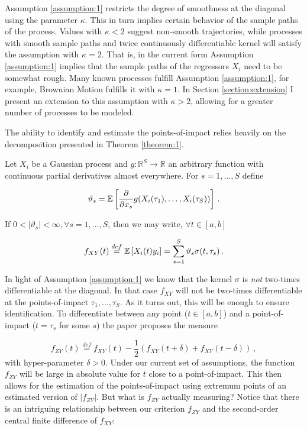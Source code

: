Assumption \ref{assumption:1} restricts the degree of smoothness at the diagonal using
the parameter $\kappa$. This in turn implies certain behavior of the sample paths of the
process. Values with $\kappa < 2$ suggest non-smooth trajectories, while processes with
smooth sample paths and twice continuously differentiable kernel will satisfy the
assumption with $\kappa = 2$. That is, in the current form Assumption \ref{assumption:1}
implies that the sample paths of the regressors $X_i$ need to be somewhat rough. Many
known processes fulfill Assumption \ref{assumption:1}, for example, Brownian Motion
fulfills it with $\kappa = 1$. In Section \ref{section:extension} I present an extension
to this assumption with $\kappa > 2$, allowing for a greater number of processes to be
modeled.


The ability to identify and estimate the points-of-impact relies heavily on the
decomposition presented in Theorem \ref{theorem:1}.


\begin{theorem}
Let $X_i$ be a Gaussian process and $g : \mathbb{R}^S \to \mathbb{R}$ an arbitrary
function with continuous partial derivatives almost everywhere. For $s=1,\dots,S$ define

\[
    \vartheta_s = \mathbb{E}\left[\frac{\partial}{\partial x_s} g(X_i(\tau_1), \dots,
    X_i(\tau_S))\right] \,.
\]

If $0 < \left| \vartheta_s \right| < \infty, \forall s=1,\dots,S$, then we may write,
$\forall t \in [a, b]$

\[
    f_{XY}(t) \stackrel{def}{=} \mathbb{E}\left[X_i(t) y_i\right] = \sum_{s=1}^S \vartheta_s
    \sigma(t, \tau_s) \,.
\]
\label{theorem:1}
\end{theorem}


In light of Assumption \ref{assumption:1} we know that the kernel $\sigma$ is \emph{not}
two-times differentiable at the diagonal. In that case $f_{XY}$ will not be two-times
differentiable at the points-of-impact $\tau_1, \dots, \tau_S$. As it turns out, this
will be enough to ensure identification. To differentiate between any point ($t \in [a,
b]$) and a point-of-impact ($t = \tau_s$ for some $s$) the paper proposes the measure

\[
    f_{ZY}(t) \stackrel{def}{=} f_{XY}(t) - \frac{1}{2} \left( f_{XY}(t + \delta) +
    f_{XY}(t - \delta) \right) \,,
\]
with hyper-parameter $\delta > 0$. Under our current set of assumptions, the function
$f_{ZY}$ will be large in absolute value for $t$ close to a point-of-impact. This then
allows for the estimation of the points-of-impact using extremum points of an estimated
version of $|f_{ZY}|$. But what is $f_{ZY}$ actually measuring? Notice that there is an
intriguing relationship between our criterion $f_{ZY}$ and the second-order central
finite difference of $f_{XY}$:

